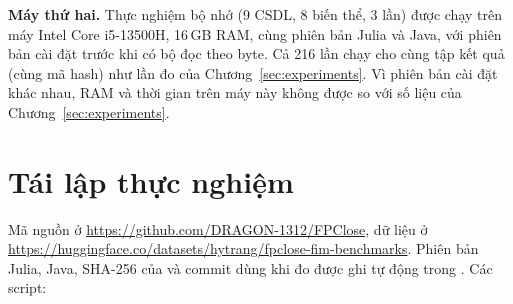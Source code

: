 \textbf{Máy thứ hai.} Thực nghiệm bộ nhớ (9 CSDL, 8 biến thể, 3 lần) được chạy trên máy Intel Core i5-13500H,
16\,GB RAM, cùng phiên bản Julia và Java, với phiên bản cài đặt trước khi có bộ đọc theo byte. Cả 216 lần chạy cho
cùng tập kết quả (cùng mã hash) như lần đo của Chương~\ref{sec:experiments}. Vì phiên bản cài đặt khác nhau, RAM và
thời gian trên máy này không được so với số liệu của Chương~\ref{sec:experiments}.

\section{Tái lập thực nghiệm}
\label{app:repro}

Mã nguồn ở \url{https://github.com/DRAGON-1312/FPClose}, dữ liệu ở
\url{https://huggingface.co/datasets/hytrang/fpclose-fim-benchmarks}. Phiên bản Julia, Java, SHA-256 của
 và commit dùng khi đo được ghi tự động trong . Các script:
